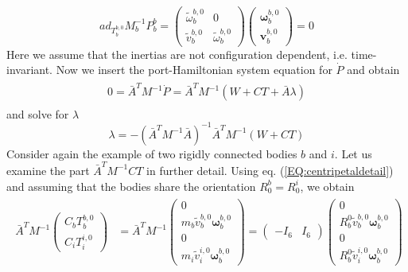 \documentclass[a4paper,twoside, openright,12pt]{report}
\newcommand{\f}[1]{\boldsymbol{#1}}
\begin{document}
{\begin{equation}
ad_{T_b^{b,0}}M_b^{-1}P_b^b = \begin{pmatrix}
\tilde{\omega}_b^{b,0} & 0 \\ \tilde{v}_b^{b,0} & \tilde{\omega}_b^{b,0}\end{pmatrix} \begin{pmatrix}\boldsymbol{\omega}_b^{b,0} \\ \f{v}_b^{b,0}\end{pmatrix} = 0
\end{equation}
Here we assume that the inertias are not configuration dependent, i.e. time-invariant. Now we insert the port-Hamiltonian system equation for $\dot{P}$ and obtain
\begin{eqnarray}
\begin{aligned}
0 = \bar{A}^T M^{-1} \dot{P} = \bar{A}^T M^{-1}(W+CT+\bar{A}\lambda)
\end{aligned}
\end{eqnarray}
and solve for $\lambda$
\begin{equation}
\lambda = -(\bar{A}^TM^{-1}\bar{A})^{-1}\bar{A}^TM^{-1}(W+CT)
\end{equation}
Consider again the example of two rigidly connected bodies $b$ and $i$. Let us examine the part $\bar{A}^TM^{-1}CT$ in further detail. Using eq. (\ref{EQ:centripetaldetail}) and assuming that the bodies share the orientation $R_0^b = R_0^i$, we obtain
\begin{eqnarray}
\begin{aligned}
\bar{A}^TM^{-1}\begin{pmatrix}
C_b T_b^{b,0} \\ C_i T_i^{i,0}
\end{pmatrix} 
&=
\bar{A}^T M^{-1} \begin{pmatrix} 0 \\ m_b \tilde{v}_b^{b,0}\boldsymbol{\omega}_b^{b,0} \\ 0 \\ m_i \tilde{v}_i^{i,0}\boldsymbol{\omega}_b^{b,0}
\end{pmatrix}
=
\begin{pmatrix}-I_6 & I_6\end{pmatrix} \begin{pmatrix}
0 \\ R_b^0 \tilde{v}_b^{b,0} \boldsymbol{\omega}_b^{b,0} \\ 0 \\
R_b^0 \tilde{v}_i^{i,0} \boldsymbol{\omega}_b^{b,0}
\end{pmatrix}  \\ 

\end{aligned}
\end{eqnarray}}
\end{document}
